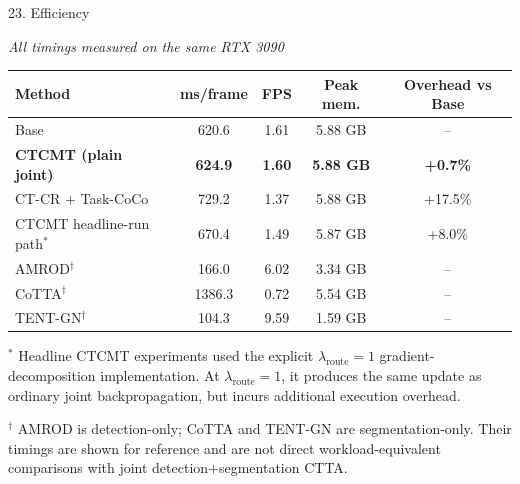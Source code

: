 \documentclass[aspectratio=169,11pt]{beamer}
\begin{document}

\begin{frame}{23. Efficiency}

\scriptsize
\centering

\textit{All timings measured on the same RTX 3090}

\vspace{0.08cm}

\setlength{\tabcolsep}{3.7pt}
\renewcommand{\arraystretch}{1.02}

\begin{tabular}{lcccc}
\toprule
\textbf{Method}
& \textbf{ms/frame}
& \textbf{FPS}
& \textbf{Peak mem.}
& \textbf{Overhead vs Base}
\\
\midrule

Base
& 620.6
& 1.61
& 5.88 GB
& -- \\

\textbf{CTCMT (plain joint)}
& \textbf{624.9}
& \textbf{1.60}
& \textbf{5.88 GB}
& \textbf{+0.7\%} \\

CT-CR + Task-CoCo
& 729.2
& 1.37
& 5.88 GB
& +17.5\% \\

CTCMT headline-run path$^\ast$
& 670.4
& 1.49
& 5.87 GB
& +8.0\% \\

\midrule

AMROD$^\dagger$
& 166.0
& 6.02
& 3.34 GB
& -- \\

CoTTA$^\dagger$
& 1386.3
& 0.72
& 5.54 GB
& -- \\

TENT-GN$^\dagger$
& 104.3
& 9.59
& 1.59 GB
& -- \\

\bottomrule
\end{tabular}

\vspace{0.05cm}

{\fontsize{5.3}{5.9}\selectfont
\raggedright
$^\ast$ Headline CTCMT experiments used the explicit
$\lambda_{\mathrm{route}}=1$ gradient-decomposition implementation.
At $\lambda_{\mathrm{route}}=1$, it produces the same update as ordinary
joint backpropagation, but incurs additional execution overhead.

$^\dagger$ AMROD is detection-only; CoTTA and TENT-GN are segmentation-only.
Their timings are shown for reference and are not direct workload-equivalent
comparisons with joint detection+segmentation CTTA.

}
\end{frame}
\end{document}
